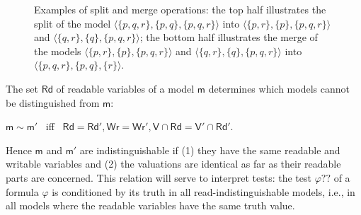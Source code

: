\documentclass{llncs}
\newcommand{\modl}{\mathsf m}
\newcommand{\readset}{\mathsf{Rd}}
\newcommand{\valuset}{\mathsf{V}}
\newcommand{\writeset}{\mathsf{Wr}}
\newcommand{\testendo}{?\!\!?}			%
\renewcommand{\phi}{\varphi}
\newcommand{\propset}{\mathbb P}
\newcommand{\set}[1]{\{#1\}}
\newcommand{\tuple}[1]{ \langle #1 \rangle}
\begin{document}
\begin{figure}[t]
  \centering
  
\caption{Examples of split and merge operations:
the top half illustrates the split of the model $\tuple{ \set{p,q,r} , \set{p,q} , \set{p,q,r} } $ into 
$\tuple{ \set{p,r} , \set{p} , \set{p,q,r} } $ and 
$\tuple{ \set{q,r} , \set{q} , \set{p,q,r} } $; 
the bottom half illustrates the merge of the models
$\tuple{ \set{p,r} , \set{p} , \set{p,q,r} } $ and 
$\tuple{ \set{q,r} , \set{q} , \set{p,q,r} } $ into
 $\tuple{ \set{p,q,r} , \set{p,q} , \set{r} } $.
}
\label{fig:splitmerge} 
\end{figure}


The set $\readset$ of readable variables of a model $\modl$ 
determines which models cannot be distinguished from $\modl$:
\begin{center}
$\modl \sim \modl'$ \ iff \ $\readset = \readset' , \writeset = \writeset' , \valuset \cap \readset = \valuset' \cap \readset' $.
\end{center}
Hence $\modl $ and $\modl'$ are indistinguishable if 
(1) they have the same readable and writable variables and  
(2) the valuations are identical as far as their readable parts are concerned.
%
This relation will serve to interpret tests: 
the test $\phi \testendo $ of a formula $\phi$ is conditioned by its truth in all read-indistinguishable models, i.e., 
in all models where the readable variables have the same truth value. 
\end{document}
